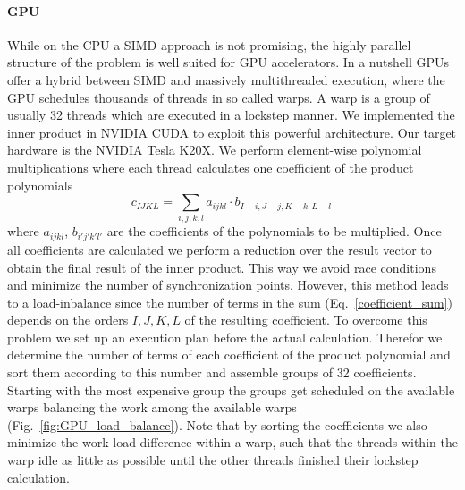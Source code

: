 \documentclass[oribibl,a4paper]{llncs2e/llncs}
\begin{document}
\paragraph{GPU}
While on the CPU a SIMD approach is not promising, the highly parallel structure of the problem is well suited for GPU accelerators.
In a nutshell GPUs offer a hybrid between SIMD and massively multithreaded execution,
where the GPU schedules thousands of threads in so called warps. A warp is a group of usually 32 threads which are executed in a lockstep manner.
We implemented the inner product in NVIDIA CUDA to exploit this powerful architecture.
Our target hardware is the NVIDIA Tesla K20X.
We perform element-wise polynomial multiplications where each thread calculates one coefficient of the product polynomials
\begin{equation} \label{coefficient_sum}
    c_{IJKL} = \sum_{i,j,k,l} a_{ijkl} \cdot b_{I-i,J-j,K-k,L-l} \,
\end{equation}
where  $a_{ijkl}$, $b_{i'j'k'l'}$ are the coefficients of the polynomials to be multiplied.
Once all coefficients are calculated we perform a reduction over the result vector to obtain the final result of the inner product.
This way we avoid race conditions and minimize the number of synchronization points.
However, this method leads to a load-inbalance since the number of terms in the sum (Eq.\ \ref{coefficient_sum}) depends on the orders $I,J,K,L$ of the resulting coefficient.
To overcome this problem we set up an execution plan before the actual calculation.
Therefor we determine the number of terms of each coefficient of the product polynomial and sort them according to this number and assemble groups of 32 coefficients.
Starting with the most expensive group the groups get scheduled on the available warps balancing the work among the available warps (Fig.\ \ref{fig:GPU_load_balance}).
Note that by sorting the coefficients we also minimize the work-load difference within a warp, such that the threads within the warp idle as little as possible until the other threads finished their lockstep calculation.
\end{document}
